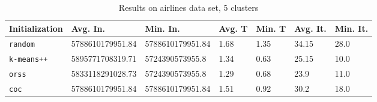 \begin{table}[h]
	\begin{center}
		\begin{tabular}{|l|l|l|l|l|l|l|}
			\hline
			Initialization & Avg. In. & Min. In. & Avg. T & Min. T & Avg. It. & Min. It.\\\hline
			\texttt{random} & 5788610179951.84 & 5788610179951.84 & 1.68 & 1.35 & 34.15 & 28.0\\\hline
			\texttt{k-means++} & 5895771708319.71 & 5724390573955.8 & 1.34 & 0.63 & 25.15 & 10.0\\\hline
			\texttt{orss} & 5833118291028.73 & 5724390573955.8 & 1.29 & 0.68 & 23.9 & 11.0\\\hline
			\texttt{coc} & 5788610179951.84 & 5788610179951.84 & 1.51 & 0.92 & 30.2 & 18.0\\\hline
		\end{tabular}
		\caption{Results on airlines data set, 5 clusters}
		\label{tbl:airlines5}
	\end{center}
\end{table}

